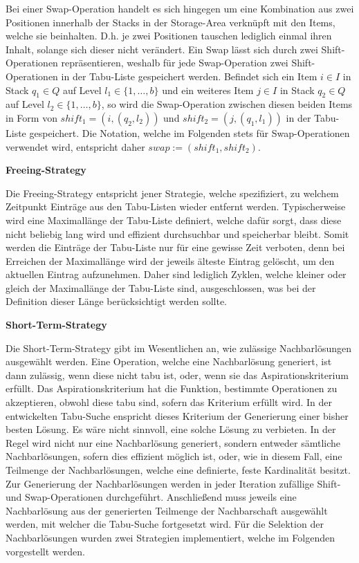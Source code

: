 Bei einer Swap-Operation handelt es sich hingegen um eine Kombination aus zwei Positionen innerhalb der Stacks in der Storage-Area verknüpft mit den Items, welche sie beinhalten. D.h. je zwei Positionen tauschen lediglich einmal ihren Inhalt,
solange sich dieser nicht verändert. Ein Swap lässt sich durch zwei Shift-Operationen repräsentieren, weshalb für jede Swap-Operation
zwei Shift-Operationen in der Tabu-Liste gespeichert werden. Befindet sich ein Item $i \in I$ in Stack $q_1 \in Q$ auf Level
$l_1 \in \{1, \dotsc, b\}$ und ein weiteres Item $j \in I$ in Stack $q_2 \in Q$ auf Level $l_2 \in \{1, \dotsc, b\}$,
so wird die Swap-Operation zwischen diesen beiden Items in Form von $shift_1 = (i, (q_2, l_2))$ und $shift_2 = (j, (q_1, l_1))$
in der Tabu-Liste gespeichert. Die Notation, welche im Folgenden stets für Swap-Operationen verwendet wird,
entspricht daher $swap := (shift_1, shift_2)$.\newline

\textbf{Freeing-Strategy}

Die Freeing-Strategy entspricht jener Strategie, welche spezifiziert, zu welchem Zeitpunkt Einträge aus den
Tabu-Listen wieder entfernt werden. Typischerweise wird eine Maximallänge der Tabu-Liste definiert,
welche dafür sorgt, dass diese nicht beliebig lang wird und effizient durchsuchbar und speicherbar bleibt.
Somit werden die Einträge der Tabu-Liste nur für eine gewisse Zeit verboten, denn bei Erreichen der Maximallänge
wird der jeweils älteste Eintrag gelöscht, um den aktuellen Eintrag aufzunehmen.
Daher sind lediglich Zyklen, welche kleiner oder gleich der Maximallänge der Tabu-Liste sind,
ausgeschlossen, was bei der Definition dieser Länge berücksichtigt werden sollte.\newline

\textbf{Short-Term-Strategy}

Die Short-Term-Strategy gibt im Wesentlichen an, wie zulässige Nachbarlösungen ausgewählt werden.
Eine Operation, welche eine Nachbarlösung generiert, ist dann zulässig, wenn diese nicht tabu ist,
oder, wenn sie das Aspirationskriterium erfüllt. Das Aspirationskriterium hat die Funktion, bestimmte
Operationen zu akzeptieren, obwohl diese tabu sind, sofern das Kriterium erfüllt wird.
In der entwickelten Tabu-Suche enspricht dieses Kriterium der Generierung einer bisher besten Lösung.
Es wäre nicht sinnvoll, eine solche Lösung zu verbieten.\newline
In der Regel wird nicht nur eine Nachbarlösung generiert, sondern entweder sämtliche Nachbarlösungen,
sofern dies effizient möglich ist, oder, wie in diesem Fall, eine Teilmenge der Nachbarlösungen,
welche eine definierte, feste Kardinalität besitzt. Zur Generierung der Nachbarlösungen werden in jeder
Iteration zufällige Shift- und Swap-Operationen durchgeführt. Anschließend muss jeweils eine Nachbarlösung
aus der generierten Teilmenge der Nachbarschaft ausgewählt werden, mit welcher die Tabu-Suche fortgesetzt wird.
Für die Selektion der Nachbarlösungen wurden zwei Strategien implementiert, welche im Folgenden vorgestellt werden.\newline

